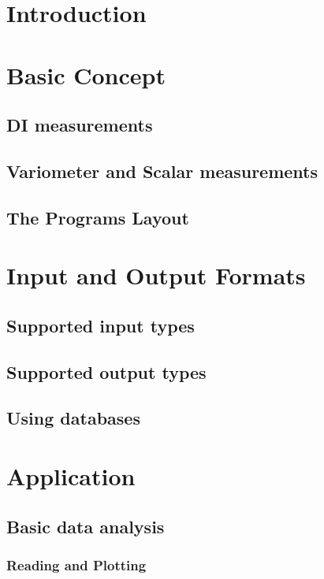 \section{Introduction}


\section{Basic Concept}

\subsection{DI measurements}

\subsection{Variometer and Scalar measurements}

\subsection{The Programs Layout}


\section{Input and Output Formats}

\subsection{Supported input types}

\subsection{Supported output types}

\subsection{Using databases}


\section{Application}

\subsection{Basic data analysis}

\subsubsection{Reading and Plotting}


